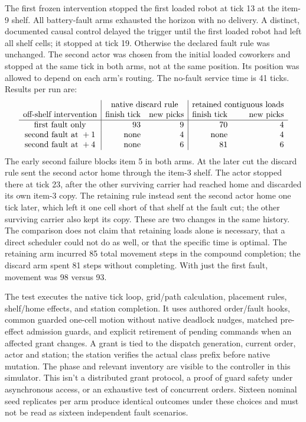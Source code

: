 \documentclass{article}
\begin{document}
The first frozen intervention stopped the first loaded robot at tick 13 at the item-9 shelf. All battery-fault arms exhausted the horizon with no delivery. A distinct, documented causal control delayed the trigger until the first loaded robot had left all shelf cells; it stopped at tick 19. Otherwise the declared fault rule was unchanged. The second actor was chosen from the initial loaded coworkers and stopped at the same tick in both arms, not at the same position. Its position was allowed to depend on each arm's routing. The no-fault service time is 41 ticks. Results per run are:
\[
\begin{array}{c|rr|rr}
 &\multicolumn{2}{c|}{\text{native discard rule}}
 &\multicolumn{2}{c}{\text{retained contiguous loads}}\\
\text{off-shelf intervention}&\text{finish tick}&\text{new picks}
 &\text{finish tick}&\text{new picks}\\\hline
\text{first fault only}&93&9&70&4\\
\text{second fault at }+1&\text{none}&4&\text{none}&4\\
\text{second fault at }+4&\text{none}&6&81&6
\end{array}
\]
The early second failure blocks item 5 in both arms. At the later cut the discard rule sent the second actor home through the item-3 shelf. The actor stopped there at tick 23, after the other surviving carrier had reached home and discarded its own item-3 copy. The retaining rule instead sent the second actor home one tick later, which left it one cell short of that shelf at the fault cut; the other surviving carrier also kept its copy. These are two changes in the same history. The comparison does not claim that retaining loads alone is necessary, that a direct scheduler could not do as well, or that the specific time is optimal. The retaining arm incurred 85 total movement steps in the compound completion; the discard arm spent 81 steps without completing. With just the first fault, movement was 98 versus 93.

The test executes the native tick loop, grid/path calculation, placement rules, shelf/home effects, and station completion. It uses authored order/fault hooks, common guarded one-cell motion without native deadlock nudges, matched pre-effect admission guards, and explicit retirement of pending commands when an affected grant changes. A grant is tied to the dispatch generation, current order, actor and station; the station verifies the actual class prefix before native mutation. The phase and relevant inventory are visible to the controller in this simulator. This isn't a distributed grant protocol, a proof of guard safety under asynchronous access, or an exhaustive test of concurrent orders. Sixteen nominal seed replicates per arm produce identical outcomes under these choices and must not be read as sixteen independent fault scenarios.
\end{document}
